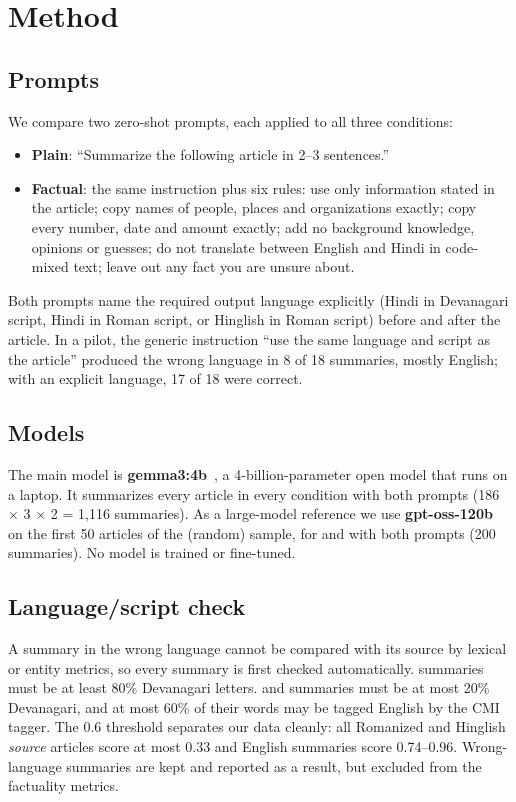 \section{Method}
\label{sec:method}

\subsection{Prompts}
We compare two zero-shot prompts, each applied to all three conditions:
\begin{itemize}
  \item \textbf{Plain}: ``Summarize the following article in 2--3 sentences.''
  \item \textbf{Factual}: the same instruction plus six rules: use only information stated in the article; copy names of people, places and organizations exactly; copy every number, date and amount exactly; add no background knowledge, opinions or guesses; do not translate between English and Hindi in code-mixed text; leave out any fact you are unsure about.
\end{itemize}
Both prompts name the required output language explicitly (Hindi in Devanagari script, Hindi in Roman script, or Hinglish in Roman script) before and after the article. In a pilot, the generic instruction ``use the same language and script as the article'' produced the wrong language in 8 of 18 summaries, mostly English; with an explicit language, 17 of 18 were correct.

\subsection{Models}
The main model is \textbf{gemma3:4b}~\cite{gemma2025gemma3}, a 4-billion-parameter open model that runs on a laptop. It summarizes every article in every condition with both prompts (186 $\times$ 3 $\times$ 2 = 1,116 summaries). As a large-model reference we use \textbf{gpt-oss-120b}~\cite{openai2025gptoss} on the first 50 articles of the (random) sample, for  and  with both prompts (200 summaries). No model is trained or fine-tuned.

\subsection{Language/script check}
A summary in the wrong language cannot be compared with its source by lexical or entity metrics, so every summary is first checked automatically.  summaries must be at least 80\% Devanagari letters.  and  summaries must be at most 20\% Devanagari, and at most 60\% of their words may be tagged English by the CMI tagger. The 0.6 threshold separates our data cleanly: all Romanized and Hinglish \emph{source} articles score at most 0.33 and English summaries score 0.74--0.96. Wrong-language summaries are kept and reported as a result, but excluded from the factuality metrics.

